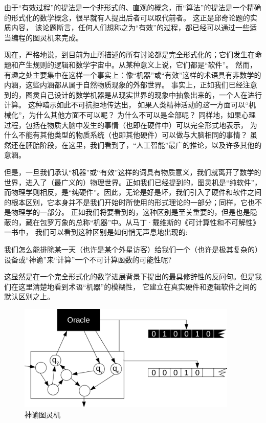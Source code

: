 \documentclass[a4paper,12pt]{article}
\begin{document}
由于“有效过程”的提法是一个非形式的、直观的概念，而“算法”的提法是一个精确的形式化的数学概念，很早就有人提出后者可以取代前者。
这正是\gls{邱奇论题}的实质内容\cite{KleeneSC1952}， 该论题断言，任何人们想称之为“有效”的过程，都已经可以通过一些适当编程的图灵机来完成。

现在，严格地说，到目前为止所描述的所有讨论都是完全形式化的；它们发生在命题和产生规则的逻辑和数学宇宙中。从某种意义上说，它们都是“软件”。
然而，有趣之处主要集中在这样一个事实上：像“机器”或“有效”这样的术语具有非数学的内涵，这些内涵都从属于自然物质现象的外部世界。
事实上，正如我们已经注意到的，图灵自己设计的数学机器是从现实世界的现象中抽象出来的，一个人在进行计算。
这种暗示如此不可抗拒地传达出， 如果人类精神活动的\emph{这一}方面可以“机械化”，为什么其他方面不可以呢？ 为什么不可以是全部呢？
同样地，如果心理过程，包括在物质大脑中发生的事情（也即在硬件中）可以完全形式地表示，
为什么不能有其他类型的物质系统（也即其他硬件）可以做与大脑相同的事情？
虽然还在胚胎阶段，在这里，我们看到了，“人工智能”最广的推论，以及许多其他的意涵。

但是，一旦我们承认“机器”或“有效”这样的词具有物质意义，我们就离开了数学的世界，进入了（最广义的）物理世界。正如我们已经提到的，图灵机是“纯软件”，
而物理学则相反，是“纯硬件”。因此，无论是好是坏，我们引入了硬件和软件之间的根本区别，它本身并不是我们开始时所使用的形式理论的一部分；同样，它也不是物理学的一部分。
正如我们将要看到的，这种区别是至关重要的，但是也是隐蔽的，藏在包罗万象的总称“机器”中。从马丁·戴维斯的《可计算性和不可解性》\cite{DavisM1958}一书中，
我们可以看到这种区别是如何悄无声息地出现的:

\begin{displayquote}
    我们怎么能排除某一天（也许是某个外星访客）给我们一个（也许是极其复杂的）设备或“神谕”来“计算”一个不可计算函数的可能性呢?
\end{displayquote}

这显然是在一个完全形式化的数学进展背景下提出的最具修辞性的反问句。但是我们在这里清楚地看到术语“机器”的模糊性，
它建立在真实硬件和逻辑软件之间的默认区别之上。

\begin{figure}[ht]
\centering
\includegraphics[height=2.0in]{images/turing_machine_oracle.png}
\caption{\gls{神谕图灵机}}
\end{figure}
\end{document}
